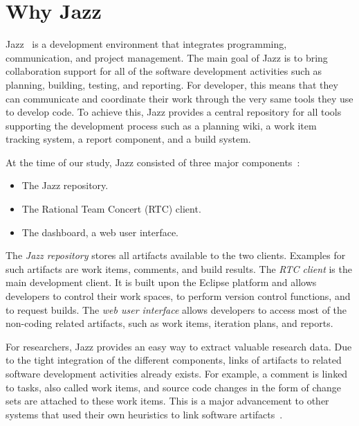 \section{Why Jazz}
Jazz~\cite{Cheng:2003:ACMQueue,frost:2007:IEEESoftware} is a development
environment that integrates programming, communication, and project management.
The main goal of Jazz is to bring collaboration support for all of the software
development activities such as planning, building, testing, and reporting. For
developer, this means that they can communicate and coordinate their work through
the very same tools they use to develop code. To achieve this, Jazz provides a
central repository for all tools supporting the development process such as a planning
wiki, a work item tracking system, a report component, and a build system.

At the time of our study, Jazz consisted of three major
components~\cite{IBM:2008:url}:
\begin{itemize}
\item The Jazz repository. 
\item The Rational Team Concert (RTC) client.
\item The dashboard, a web user interface.
\end{itemize}
The \emph{Jazz repository} stores all artifacts available to the two clients. 
Examples for such artifacts are work items, comments, and build results. 
The \emph{RTC client} is the main development client. 
It is built upon the Eclipse platform and allows developers to control their work spaces, to perform version control functions, and to request builds. 
The \emph{web user interface} allows developers to access most of the non-coding related artifacts, such as work items, iteration plans, and reports. 

For researchers, Jazz provides an easy way to extract valuable research data. Due
to the tight integration of the different components, links of artifacts to
related software development activities already exists. For example, a comment
is linked to tasks, also called work items, and source code changes in the form
of change sets are attached to these work items. This is a major advancement to
other systems that used their own heuristics to link software
artifacts~\cite{cubranic:2003:icse}.



